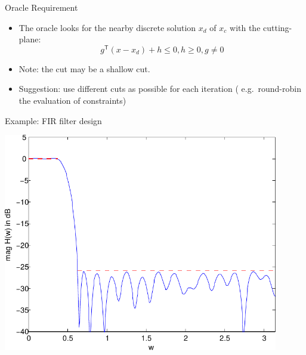 \documentclass[10pt,ignorenonframetext,serif,onlymath]{beamer}
\begin{document}
\begin{frame}{Oracle Requirement}
\protect\hypertarget{sec:oracle-requirement}{}

\begin{itemize}
\item
  The oracle looks for the nearby discrete solution \(x_d\) of \(x_c\)
  with the cutting-plane:
  \[g^\mathsf{T} (x - x_d) + h \leq 0, h \geq 0, g \neq 0\]
\item
  Note: the cut may be a shallow cut.
\item
  Suggestion: use different cuts as possible for each iteration (
  e.g.~round-robin the evaluation of constraints)
\end{itemize}

\end{frame}

\begin{frame}{Example: FIR filter design}
\protect\hypertarget{sec:example-fir-filter-design-1}{}

\includegraphics[width=0.9\textwidth,height=\textheight]{ellipsoid.files/lowpass_ripple.pdf}

\end{frame}
\end{document}
